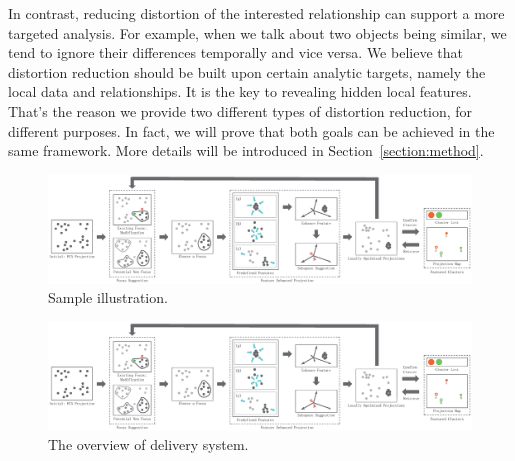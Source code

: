 In contrast, reducing distortion of the interested relationship can support a more targeted analysis. For example, when we talk about two objects being similar, we tend to ignore their differences temporally and vice versa. We believe that distortion reduction should be built upon certain analytic targets, namely the local data and relationships. It is the key to revealing hidden local features. That's the reason we provide two different types of distortion reduction, for different purposes. In fact, we will prove that both goals can be achieved in the same framework. More details will be introduced in Section~\ref{section:method}.

\ifx
\begin{figure}[htb]
\centering
\includegraphics{images/Pipeline.eps}
\caption{Sample illustration.}
\end{figure}
\else
\begin{figure}[htbp]
\centering
  \includegraphics[width=1\linewidth]{images/Pipeline.eps}%
  \caption{The overview of delivery system.}
\label{fig:workflow}
  \end{figure}
  \fi


